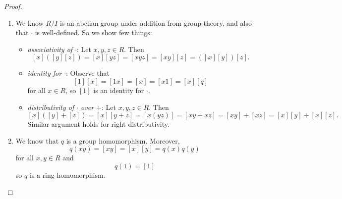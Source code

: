\documentclass[pmath347]{subfiles}
\begin{document}
    \begin{proof}
        \begin{enumerate}
            \item We know $R /I$ is an abelian group under addition from group theory, and also that $\cdot$ is well-defined. So we show few things:
                \begin{itemize}
                    \item \textit{associativity of $\cdot$}: Let $x,y,z\in R$. Then
                        \begin{equation*}
                            \left[ x \right] \left( \left[ y \right] \left[ z \right]  \right) = \left[ x \right] \left[ yz \right] = \left[ xyz \right] = \left[ xy \right] \left[ z \right] = \left( \left[ x \right] \left[ y \right]  \right) \left[ z \right] . 
                        \end{equation*}

                    \item \textit{identity for $\cdot$}: Observe that
                        \begin{equation*}
                            \left[ 1 \right] \left[ x \right] = \left[ 1x \right] = \left[ x \right] = \left[ x1 \right] = \left[ x \right] \left[ q \right] 
                        \end{equation*}
                        for all $x\in R$, so $\left[ 1 \right]$ is an identity for $\cdot$.

                    \item \textit{distributivity of $\cdot$ over $+$}: Let $x,y,z\in R$. Then
                        \begin{equation*}
                            \left[ x \right] \left( \left[ y \right] +\left[ z \right]  \right) = \left[ x \right] \left[ y+z \right] = \left[ x\left( yz \right)  \right] = \left[ xy+xz \right] = \left[ xy \right] + \left[ xz \right] = \left[ x \right] \left[ y \right] + \left[ x \right] \left[ z \right] .
                        \end{equation*}
                        Similar argument holds for right distributivity. \qqqedsym
                \end{itemize} 

            \item We know that $q$ is a group homomorphism. Moreover,
                \begin{equation*}
                    q\left( xy \right) = \left[ xy \right] = \left[ x \right] \left[ y \right] = q\left( x \right) q\left( y \right) 
                \end{equation*}
                for all $x,y\in R$ and
                \begin{equation*}
                    q\left( 1 \right) = \left[ 1 \right] 
                \end{equation*}
                so $q$ is a ring homomorphism. \qqedsym
        \end{enumerate}
    \end{proof}
    
\end{document}

